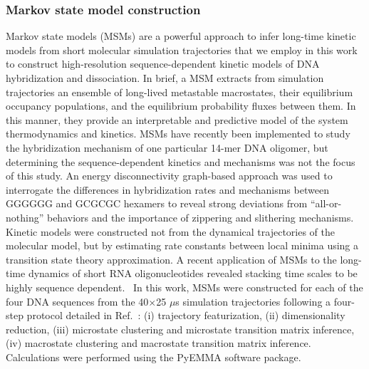 \documentclass[journal=jpcbfk,manuscript=article]{achemso}
\begin{document}
\subsubsection{Markov state model construction}

Markov state models (MSMs) are a powerful approach to infer long-time kinetic models from short molecular simulation trajectories \citep{Sengupta2019AutomatedSelf-assembly, Pande2010EverythingAsk, Chodera2014MarkovDynamics, Husic2018MarkovScience, Wehmeyer2019IntroductionSoftware} that we employ in this work to construct high-resolution sequence-dependent kinetic models of DNA hybridization and dissociation. In brief, a MSM extracts from simulation trajectories an ensemble of long-lived metastable macrostates, their equilibrium occupancy populations, and the equilibrium probability fluxes between them. In this manner, they provide an interpretable and predictive model of the system thermodynamics and kinetics. MSMs have recently been implemented to study the hybridization mechanism of one particular 14-mer DNA oligomer, but determining the sequence-dependent kinetics and mechanisms was not the focus of this study.\citep{Jin2019} An energy disconnectivity graph-based approach was used to interrogate the differences in hybridization rates and mechanisms between GGGGGG and GCGCGC hexamers to reveal strong deviations from ``all-or-nothing'' behaviors and the importance of zippering and slithering mechanisms.~\citep{Xiao2019} Kinetic models were constructed not from the dynamical trajectories of the molecular model, but by estimating rate constants between local minima using a transition state theory approximation. A recent application of MSMs to the long-time dynamics of short RNA oligonucleotides revealed stacking time scales to be highly sequence dependent.~\citep{Pinamonti2017} In this work, MSMs were constructed for each of the four DNA sequences from the 40$\times$25 $\mu$s simulation trajectories following a four-step protocol detailed in Ref.~\citep{Sidky2019High-ResolutionVAMPnets}: (i) trajectory featurization, (ii) dimensionality reduction, (iii) microstate clustering and microstate transition matrix inference, (iv) macrostate clustering and macrostate transition matrix inference. Calculations were performed using the PyEMMA software package. \citep{Scherer2015PyEMMAModels}
\end{document}

